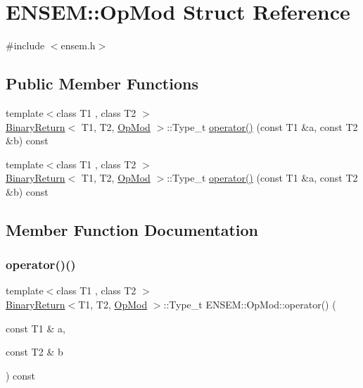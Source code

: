 \hypertarget{structENSEM_1_1OpMod}{}\section{E\+N\+S\+EM\+:\+:Op\+Mod Struct Reference}
\label{structENSEM_1_1OpMod}


{\ttfamily \#include $<$ensem.\+h$>$}

\subsection*{Public Member Functions}
\begin{DoxyCompactItemize}
\item 
{\footnotesize template$<$class T1 , class T2 $>$ }\\\mbox{\hyperlink{structENSEM_1_1BinaryReturn}{Binary\+Return}}$<$ T1, T2, \mbox{\hyperlink{structENSEM_1_1OpMod}{Op\+Mod}} $>$\+::Type\+\_\+t \mbox{\hyperlink{structENSEM_1_1OpMod_ab377d613c8fa223caa60de3292a55685}{operator()}} (const T1 \&a, const T2 \&b) const
\item 
{\footnotesize template$<$class T1 , class T2 $>$ }\\\mbox{\hyperlink{structENSEM_1_1BinaryReturn}{Binary\+Return}}$<$ T1, T2, \mbox{\hyperlink{structENSEM_1_1OpMod}{Op\+Mod}} $>$\+::Type\+\_\+t \mbox{\hyperlink{structENSEM_1_1OpMod_ab377d613c8fa223caa60de3292a55685}{operator()}} (const T1 \&a, const T2 \&b) const
\end{DoxyCompactItemize}


\subsection{Member Function Documentation}
\mbox{\label{structENSEM_1_1OpMod_ab377d613c8fa223caa60de3292a55685}} 
\subsubsection{\texorpdfstring{operator()()}{operator()()}\hspace{0.1cm}{\footnotesize\ttfamily [1/2]}}
{\footnotesize\ttfamily template$<$class T1 , class T2 $>$ \\
\mbox{\hyperlink{structENSEM_1_1BinaryReturn}{Binary\+Return}}$<$T1, T2, \mbox{\hyperlink{structENSEM_1_1OpMod}{Op\+Mod}} $>$\+::Type\+\_\+t E\+N\+S\+E\+M\+::\+Op\+Mod\+::operator() (\begin{DoxyParamCaption}\item[{const T1 \&}]{a,  }\item[{const T2 \&}]{b }\end{DoxyParamCaption}) const\hspace{0.3cm}{\ttfamily [inline]}}

